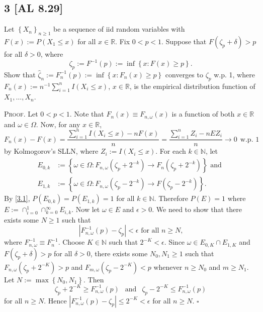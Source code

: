 \documentclass[12pt]{article}
\newcounter{ProofCounter}
\newenvironment{Proof}{\stepcounter{ProofCounter}\textsc{Proof.}}{\hfill$\square$}
\begin{document}
\subsection*{3 [AL 8.29]}
\begin{tcolorbox}
Let $\left\{ X_{n} \right\}_{n\geq 1}$ be a sequence of iid random variables with $F(x) := P(X_{1} \leq x)$ for all $x \in \mathbb{R}$. Fix $0 < p <
1$. Suppose that $F(\zeta_{p} + \delta) > p$ for all $\delta> 0$, where 
\[ \zeta_p := F^{-1}(p) := \inf\left\{ x : F(x) \geq p \right\}. \]
Show that $\hat{\zeta}_{n} := F_{n}^{-1}(p) := \inf\left\{ x : F_{n}(x) \geq p \right\}$ converges to $\zeta_{p}$ w.p. 1, where $F_{n}(x) :=
n^{-1}\sum_{i=1}^{n}I(X_{i} \leq x)$, $x \in \mathbb{R}$, is the empirical distribution function of $X_{1}, \hdots, X_{n}$.
\end{tcolorbox}
\begin{Proof}
Let $0 < p < 1$. Note that $F_{n}(x) \equiv F_{n,\omega}(x)$ is a function of both $x \in \mathbb{R}$ and $\omega \in \Omega$. Now, for any $x \in
\mathbb{R}$,
\begin{equation}
F_{n}(x) - F(x) = \frac{\sum_{i=1}^{n}I(X_{i} \leq x) - nF(x)}{n} = \frac{\sum_{i=1}^{n}Z_{i} - nEZ_{i}}{n} \rightarrow 0 \ \ \text{w.p. 1} 
\label{3.1}
\end{equation}
by Kolmogorov's SLLN, where $Z_{i} := I(X_{i} \leq x)$. For each $k \in \mathbb{N}$, let 
\begin{align*}
E_{0,k} & := \left\{ \omega \in \Omega : F_{n,\omega}(\zeta_{p} + 2^{-k}) \rightarrow F_{n}(\zeta_{p} + 2^{-k}) \right\} \text{ and } \\
E_{1,k} & := \left\{ \omega \in \Omega : F_{n,\omega}(\zeta_{p} - 2^{-k}) \rightarrow F(\zeta_{p}-2^{-k})\right\}.
\end{align*}
By \eqref{3.1}, $P(E_{0,k}) = P(E_{1,k}) = 1$ for all $k \in \mathbb{N}$. Therefore $P(E) = 1$ where $E := \cap_{i=0}^{1}\cap_{k=0}^{\infty}E_{i,k}$.
Now let $\omega \in E$ and $\epsilon > 0$. We need to show that there exists some $N \geq 1$ such that 
\[ |F_{n,\omega}^{-1}(p) - \zeta_p| < \epsilon \text{ for all $n \geq N$,} \]
where $F_{n,\omega}^{-1} \equiv F_{n}^{-1}$.
Choose $K \in \mathbb{N}$ such that $2^{-K} < \epsilon$. Since $\omega \in E_{0,K}\cap E_{1,K}$ and $F(\zeta_{p} + \delta) > p$ for all $\delta
> 0$, there exists some $N_{0}, N_{1} \geq 1$ such that 
$F_{n,\omega}(\zeta_{p} + 2^{-K}) > p$ and $F_{m,\omega}(\zeta_p - 2^{-K}) < p$ whenever $n \geq N_{0}$ and $m \geq N_{1}$. Let $N := \max\left\{
N_{0}, N_{1} \right\}$.
Then 
\[ \zeta_p + 2^{-K} \geq F_{n,\omega}^{-1}(p)\  \ \text{ and }\ \ \zeta_p - 2^{-K} \leq F_{n,\omega}^{-1}(p) \] 
for all $n \geq N$. Hence $|F_{n,\omega}^{-1}(p) - \zeta_p| \leq 2^{-K} < \epsilon$ for all $n \geq N$.
\end{Proof}
\end{document}
